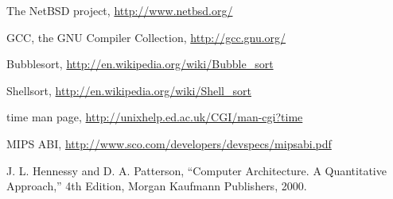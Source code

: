 \documentclass{article}
\begin{document}
\begin{thebibliography}{99}

	 The NetBSD project, \url{http://www.netbsd.org/}

	 GCC, the GNU Compiler Collection, \url{http://gcc.gnu.org/}

	 Bubblesort, \url{http://en.wikipedia.org/wiki/Bubble_sort}

	 Shellsort, \url{http://en.wikipedia.org/wiki/Shell_sort}

	 time man page, \url{http://unixhelp.ed.ac.uk/CGI/man-cgi?time}

	 MIPS ABI, \url{http://www.sco.com/developers/devspecs/mipsabi.pdf}

	 J. L. Hennessy and D. A. Patterson, ``Computer Architecture. A Quantitative
	Approach,'' 4th Edition, Morgan Kaufmann Publishers, 2000.

	\end{thebibliography}

\newpage
\end{document}
